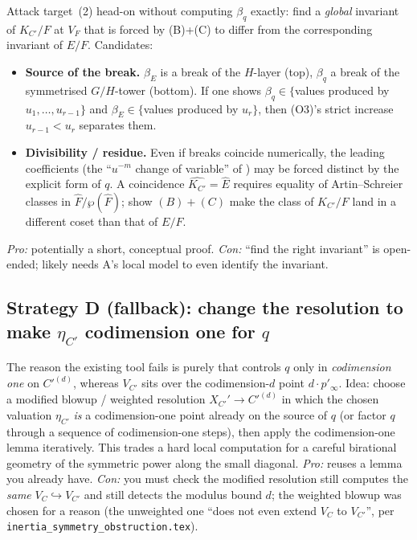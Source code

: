\documentclass[11pt]{article}
\begin{document}
Attack target~(2) head-on without computing $\beta_q$ exactly: find a
\emph{global} invariant of $K_{C'}/F$ at $V_F$ that is forced by (B)+(C) to differ
from the corresponding invariant of $E/F$. Candidates:
\begin{itemize}
  \item \textbf{Source of the break.} $\beta_E$ is a break of the $H$-layer
        (top), $\beta_q$ a break of the symmetrised $G/H$-tower (bottom). If one
        shows $\beta_q\in\{$values produced by $u_1,\dots,u_{r-1}\}$ and
        $\beta_E\in\{$values produced by $u_r\}$, then (O3)'s strict increase
        $u_{r-1}<u_r$ separates them.
  \item \textbf{Divisibility / residue.} Even if breaks coincide numerically,
        the leading coefficients (the ``$u^{-m}$ change of variable'' of
        ) may be forced distinct by
        the explicit form of $q$. A coincidence $\widehat{K_{C'}}=\widehat E$
        requires equality of Artin--Schreier classes in
        $\widehat F/\wp(\widehat F)$; show $(B)+(C)$ make the class of
        $K_{C'}/F$ land in a different coset than that of $E/F$.
\end{itemize}
\emph{Pro:} potentially a short, conceptual proof. \emph{Con:} ``find the right
invariant'' is open-ended; likely needs A's local model to even identify the
invariant.

\subsection*{Strategy D (fallback): change the resolution to make $\eta_{C'}$
codimension one for $q$}

The reason the existing tool fails is purely that
 controls $q$ only in
\emph{codimension one} on $C'^{(d)}$, whereas $V_{C'}$ sits over the
codimension-$d$ point $d\cdot p'_\infty$. Idea: choose a modified
blowup / weighted resolution $X_{C'}'\to C'^{(d)}$ in which the chosen valuation
$\eta_{C'}$ \emph{is} a codimension-one point already on the source of $q$ (or
factor $q$ through a sequence of codimension-one steps), then apply the
codimension-one lemma iteratively. This trades a hard local computation for a
careful birational geometry of the symmetric power along the small diagonal.
\emph{Pro:} reuses a lemma you already have. \emph{Con:} you must check the
modified resolution still computes the \emph{same} $V_C\hookrightarrow V_{C'}$
and still detects the modulus bound $d$; the weighted blowup was chosen for a
reason (the unweighted one ``does not even extend $V_C$ to $V_{C'}$'', per
\texttt{inertia\_symmetry\_obstruction.tex}).
\end{document}
